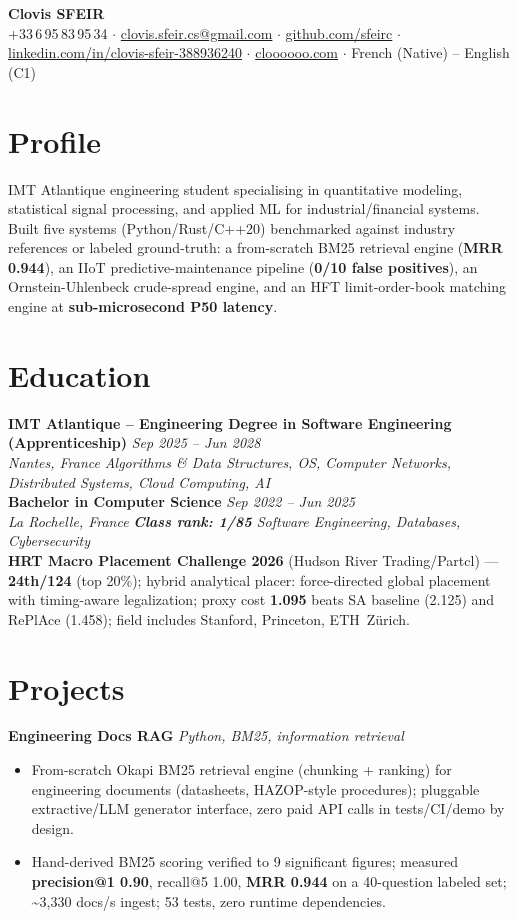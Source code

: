 \documentclass[10pt]{article}
\newcommand{\entry}[4]{%
  \noindent\textbf{#1} \hfill \textit{#2} \\
  \textit{#3} \hfill \textit{#4}\\[-0.3em]
}
\newcommand{\projectentry}[2]{%
  \noindent\textbf{#1} \hfill \textit{#2}\\[-0.3em]
}
\begin{document}
\fontsize{9.3pt}{11pt}\selectfont
\begin{center}
  {\LARGE \textbf{Clovis SFEIR}}\\[0.3em]
  +33\,6\,95\,83\,95\,34 \;$\cdot$\; \href{mailto:clovis.sfeir.cs@gmail.com}{clovis.sfeir.cs@gmail.com} \;$\cdot$\;
  \href{https://github.com/sfeirc}{github.com/sfeirc} \;$\cdot$\;
  \href{https://linkedin.com/in/clovis-sfeir-388936240}{linkedin.com/in/clovis-sfeir-388936240} \;$\cdot$\;
  \href{https://cloooooo.com}{cloooooo.com} \;$\cdot$\; French (Native) -- English (C1)
\end{center}

\section*{Profile}
IMT Atlantique engineering student specialising in quantitative modeling, statistical signal processing, and applied ML for industrial/financial systems. Built five systems (Python/Rust/C++20) benchmarked against industry references or labeled ground-truth: a from-scratch BM25 retrieval engine (\textbf{MRR 0.944}), an IIoT predictive-maintenance pipeline (\textbf{0/10 false positives}), an Ornstein-Uhlenbeck crude-spread engine, and an HFT limit-order-book matching engine at \textbf{sub-microsecond P50 latency}.

\section*{Education}
\entry{IMT Atlantique -- Engineering Degree in Software Engineering (Apprenticeship)}{Sep 2025 -- Jun 2028}{Nantes, France}{Algorithms \& Data Structures, OS, Computer Networks, Distributed Systems, Cloud Computing, AI}
\entry{Bachelor in Computer Science}{Sep 2022 -- Jun 2025}{La Rochelle, France}{\textbf{Class rank: 1/85} \textbar{} Software Engineering, Databases, Cybersecurity}
\noindent\textbf{HRT Macro Placement Challenge 2026} (Hudson River Trading/Partcl) --- \textbf{24th/124} (top 20\%); hybrid analytical placer: force-directed global placement with timing-aware legalization; proxy cost \textbf{1.095} beats SA baseline (2.125) and RePlAce (1.458); field includes Stanford, Princeton, ETH~Z\"urich.

\section*{Projects}

\projectentry{Engineering Docs RAG}{Python, BM25, information retrieval}
\begin{itemize}
  \item From-scratch Okapi BM25 retrieval engine (chunking + ranking) for engineering documents (datasheets, HAZOP-style procedures); pluggable extractive/LLM generator interface, zero paid API calls in tests/CI/demo by design.
  \item Hand-derived BM25 scoring verified to 9 significant figures; measured \textbf{precision@1 0.90}, recall@5 1.00, \textbf{MRR 0.944} on a 40-question labeled set; \textasciitilde3{,}330 docs/s ingest; 53 tests, zero runtime dependencies.
\end{itemize}
\end{document}
